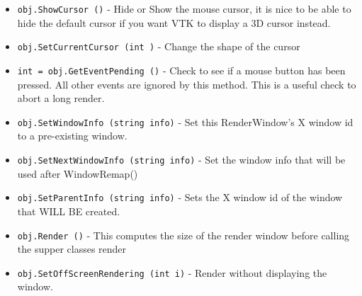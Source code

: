 \begin{itemize}
\item  \verb|obj.ShowCursor ()| -  Hide or Show the mouse cursor, it is nice to be able to hide the
 default cursor if you want VTK to display a 3D cursor instead.

\item  \verb|obj.SetCurrentCursor (int )| -  Change the shape of the cursor

\item  \verb|int = obj.GetEventPending ()| -  Check to see if a mouse button has been pressed.
 All other events are ignored by this method.
 This is a useful check to abort a long render.

\item  \verb|obj.SetWindowInfo (string info)| -  Set this RenderWindow's X window id to a pre-existing window.

\item  \verb|obj.SetNextWindowInfo (string info)| -  Set the window info that will be used after WindowRemap()

\item  \verb|obj.SetParentInfo (string info)| -  Sets the X window id of the window that WILL BE created.

\item  \verb|obj.Render ()| -  This computes the size of the render window 
 before calling the supper classes render

\item  \verb|obj.SetOffScreenRendering (int i)| -  Render without displaying the window.

\end{itemize}
